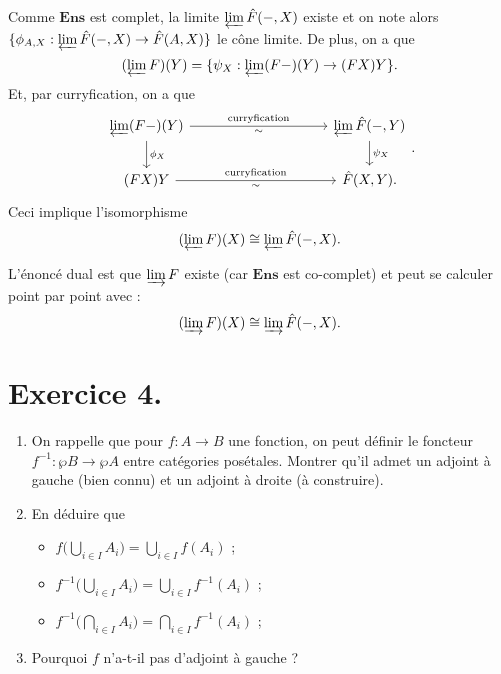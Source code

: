 \documentclass{../../td}
\begin{document}
  Comme $\mathbf{Ens}$ est complet, la limite $\varprojlim \hat{F}(-, X)$ existe et on note alors~$\{\phi_{A,X}: \varprojlim \hat{F}(-, X) \to \hat{F}(A, X) \}$ le cône limite.
  De plus, on a que \[
    (\varprojlim F)(Y) = \{\psi_X : \varprojlim (F-)(Y) \to (F X)Y\} 
  .\]
  Et, par curryfication, on a que 
  \[
    \begin{tikzcd}[column sep={160,between origins}]
    \arrow{d}{\phi_X} \varprojlim (F-)(Y) \arrow{r}{\text{curryfication}}[swap]{\sim} & \varprojlim \hat{F}(-, Y) \arrow{d}{\psi_X}\\
    (F X)Y \arrow{r}{\text{curryfication}}[swap]{\sim} & \hat{F}(X,Y).
  \end{tikzcd}
  .\]
  Ceci implique l'isomorphisme \[
    (\varprojlim F)(X) \cong \varprojlim \hat{F}(-, X)
  .\]

  L'énoncé dual est que $\varinjlim F$ existe (car $\mathbf{Ens}$ est co-complet) et peut se calculer point par point avec :
  \[
    (\varinjlim F)(X) \cong \varinjlim \hat{F}(-, X)
  .\] 

  \chapter{Exercice 4.}
  \begin{slshape}
    \color{deepblue}
    \begin{enumerate}
      \item On rappelle que pour $f : A \to B$ une fonction, on peut définir le foncteur $f^{-1} : \wp B \to \wp A$ entre catégories posétales. Montrer qu'il admet un adjoint à gauche (bien connu) et un adjoint à droite (à construire).
      \item En déduire que
        \begin{itemize}
          \item $f\big(\bigcup_{i \in I} A_i\big) = \bigcup_{i \in  I} f(A_i)$ ;
          \item $f^{-1}\big(\bigcup_{i \in I} A_i\big) = \bigcup_{i \in  I} f^{-1}(A_i)$ ;
          \item $f^{-1}\big(\bigcap_{i \in I} A_i\big) = \bigcap_{i \in  I} f^{-1}(A_i)$ ;
        \end{itemize}
      \item Pourquoi $f$ n'a-t-il pas d'adjoint à gauche ?
    \end{enumerate}
  \end{slshape}
\end{document}
